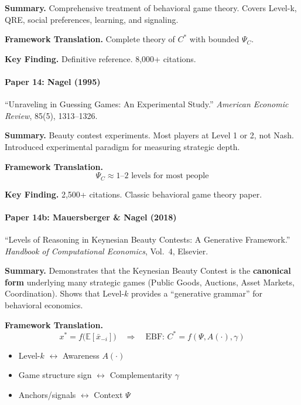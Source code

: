 \textbf{Summary.}
Comprehensive treatment of behavioral game theory. Covers Level-k, QRE, 
social preferences, learning, and signaling.

\textbf{Framework Translation.}
Complete theory of $C^*$ with bounded $\Psi_C$.

\textbf{Key Finding.}
Definitive reference. 8,000+ citations.

\paragraph{Paper 14: Nagel (1995)}

``Unraveling in Guessing Games: An Experimental Study.''
\textit{American Economic Review}, 85(5), 1313--1326.

\textbf{Summary.}
Beauty contest experiments. Most players at Level 1 or 2, not Nash.
Introduced experimental paradigm for measuring strategic depth.

\textbf{Framework Translation.}
\begin{equation}
\Psi_C \approx 1\text{--}2 \text{ levels for most people}
\end{equation}

\textbf{Key Finding.}
2,500+ citations. Classic behavioral game theory paper.

\paragraph{Paper 14b: Mauersberger \& Nagel (2018)}

``Levels of Reasoning in Keynesian Beauty Contests: A Generative Framework.''
\textit{Handbook of Computational Economics}, Vol.\ 4, Elsevier.

\textbf{Summary.}
Demonstrates that the Keynesian Beauty Contest is the \textbf{canonical form}
underlying many strategic games (Public Goods, Auctions, Asset Markets, Coordination).
Shows that Level-$k$ provides a ``generative grammar'' for behavioral economics.

\textbf{Framework Translation.}
\begin{equation}
x^* = f\bigl(\mathbb{E}[\bar{x}_{-i}]\bigr) \quad \Rightarrow \quad
\text{EBF: } C^* = f(\Psi, A(\cdot), \gamma)
\end{equation}

\begin{itemize}[nosep]
    \item Level-$k$ $\leftrightarrow$ Awareness $A(\cdot)$
    \item Game structure sign $\leftrightarrow$ Complementarity $\gamma$
    \item Anchors/signals $\leftrightarrow$ Context $\Psi$
\end{itemize}

